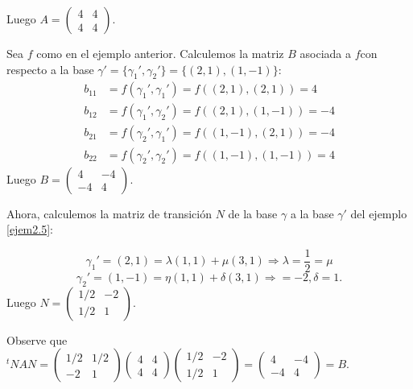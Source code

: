 		Luego $ A = \left(\begin{matrix}
		4 & 4 \\ 4 & 4
		\end{matrix}\right) $.
		\begin{ejem} \label{ejem2.6}
			\normalfont 
			Sea $ f $ como en el ejemplo anterior. Calculemos la matriz $ B $ asociada a $ f  $con respecto a la base $ \gamma' = \{\gamma_{1}', \gamma_{2}'\} =   \{(2, 1), (1, -1)\}:
			$
			\begin{align*}
			b_{11} &= f (\gamma_{1}', \gamma_{1}' ) = f ((2, 1), (2, 1)) =  4 \\  	b_{12} &= f (\gamma_{1}', \gamma_{2}' ) = f ((2, 1), (1, -1)) = -4 \\ b_{21} &= f (\gamma_{2}', \gamma_{1}' ) = f ((1, -1), (2, 1)) = -4  \\ b_{22} &= f (\gamma_{2}', \gamma_{2}' ) = f((1, -1), (1, -1)) =  4
			\end{align*}
				Luego $ B = \left(\begin{matrix}
			4 & -4 \\ -4 & 4
			\end{matrix}\right) $.
		\end{ejem}
		Ahora, calculemos la matriz de transición $ N $ de la base $\gamma$ a la base $\gamma'$ del ejemplo \ref{ejem2.5}:
		
		\[ \gamma_{1}' = (2,1) = \lambda(1,1)+\mu(3,1) \Longrightarrow \lambda = \frac{1}{2} = \mu \]
		\[ \gamma_{2}' = (1,-1) = \eta(1,1)+\delta(3,1) \Longrightarrow = -2, \delta = 1. \]
		Luego $ N = \left(\begin{matrix}
		1/2  & -2\\ 1/2  & 1
		\end{matrix}\right) $.
		
		Observe que  $ ^{t}N AN = \left(\begin{matrix}
		1/2  & 1/2\\ -2  & 1
		\end{matrix}\right)\left(\begin{matrix}
		4 & 4 \\ 4 & 4
		\end{matrix}\right)\left(\begin{matrix}
		1/2  & -2\\ 1/2  & 1
		\end{matrix}\right) = \left(\begin{matrix}
		4 & -4 \\ -4 & 4
		\end{matrix}\right) = B.$
		
